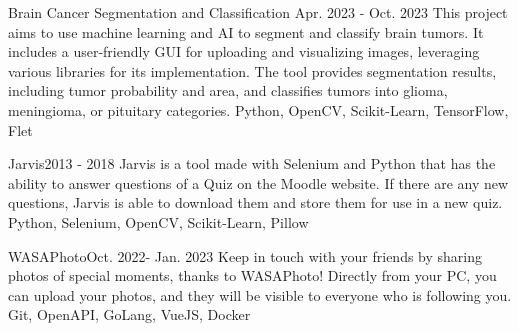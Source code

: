 
\begin{projects}
	\project
	{Brain Cancer Segmentation and Classification}{ Apr. 2023 - Oct. 2023}
	{ }
	{This project aims to use machine learning and AI to segment and classify brain tumors. It includes a user-friendly GUI for uploading and visualizing images, leveraging various libraries for its implementation. The tool provides segmentation results, including tumor probability and area, and classifies tumors into glioma, meningioma, or pituitary categories.}
	{Python, OpenCV, Scikit-Learn, TensorFlow, Flet}
				
	\project
	{Jarvis}{2013 - 2018}
	{}
	{Jarvis is a tool made with Selenium and Python that has the ability to answer questions of a Quiz on the Moodle website. If there are any new questions, Jarvis is able to download them and store them for use in a new quiz.}
	{Python, Selenium, OpenCV, Scikit-Learn, Pillow}

	\project
	{WASAPhoto}{Oct. 2022- Jan. 2023}
	{}
	{Keep in touch with your friends by sharing photos of special moments, thanks to WASAPhoto! Directly from your PC, you can upload your photos, and they will be visible to everyone who is following you.}
	{Git, OpenAPI, GoLang, VueJS, Docker}
\end{projects}